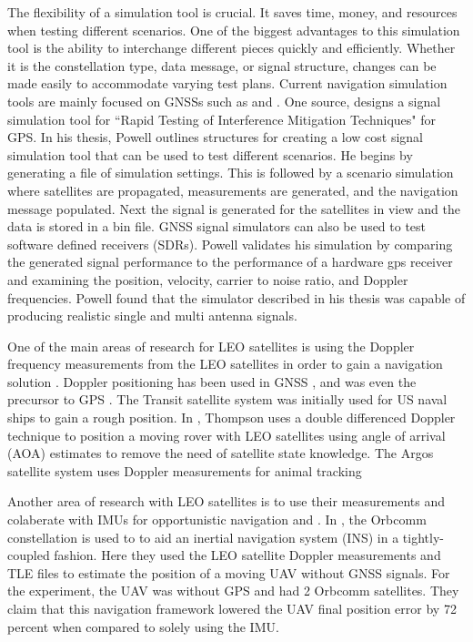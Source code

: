 \documentclass[12pt]{report}
\begin{document}
The flexibility of a simulation tool is crucial. It saves time, money, and resources when testing different scenarios. One of the biggest advantages to this simulation tool is the ability to interchange different pieces quickly and efficiently. Whether it is the constellation type, data message, or signal structure, changes can be made easily to accommodate varying test plans. Current navigation simulation tools are mainly focused on GNSSs such as \cite{dongIFGPSSignal2003} and \cite{corbellDesignValidationAccurate2000}. One source, \cite{powellMultipleAntennaSoftwareGPS} designs a signal simulation tool for ``Rapid Testing of Interference Mitigation Techniques" for GPS. In his thesis, Powell outlines structures for creating a low cost signal simulation tool that can be used to test different scenarios. He begins by generating a file of simulation settings. This is followed by a scenario simulation where satellites are propagated, measurements are generated, and the navigation message populated. Next the signal is generated for the satellites in view and the data is stored in a bin file. GNSS signal simulators can also be used to test software defined receivers (SDRs). Powell validates his simulation by comparing the generated signal performance to the performance of a hardware gps receiver and examining the position, velocity, carrier to noise ratio, and Doppler frequencies. Powell found that the simulator described in his thesis was capable of producing realistic single and multi antenna signals. 


One of the main areas of research for LEO satellites is using the Doppler frequency measurements from the LEO satellites in order to gain a navigation solution \cite{hsuAssessmentUsingDoppler2014} \cite{psiakiNavigationUsingCarrier2021}. Doppler positioning has been used in GNSS \cite{bahramiGNSSDopplerPositioning}, and was even the precursor to GPS \cite{TransitSatelliteSpacebased}. The Transit satellite system was initially used for US naval ships to gain a rough position. In \cite{thompsonSingleDifferencedDoppler2021}, Thompson uses a double differenced Doppler technique to position a moving rover with LEO satellites using angle of arrival (AOA) estimates to remove the need of satellite state knowledge. The Argos satellite system uses Doppler measurements for animal tracking \cite{lopezImprovingArgosDoppler2014}
  

Another area of research with LEO satellites is to use their measurements and colaberate with IMUs for opportunistic navigation\cite{khalifeReceiverDesignDoppler2019} and \cite{tanNewMethodPositioning2019}. In \cite{moralesInertialNavigationSystem2018}, the Orbcomm constellation is used to to aid an inertial navigation system (INS) in a tightly-coupled fashion. Here they used the LEO satellite Doppler measurements and TLE files to estimate the position of a moving UAV without GNSS signals. For the experiment, the UAV was without GPS and had 2 Orbcomm satellites. They claim that this navigation framework lowered the UAV final position error by 72 percent when compared to solely using the IMU.
\end{document}
